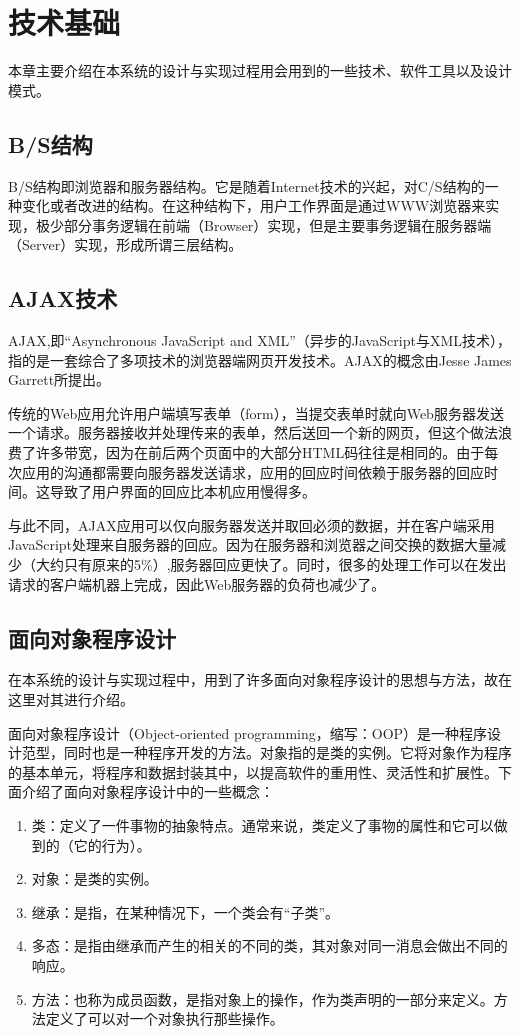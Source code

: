 
\chapter{技术基础}
本章主要介绍在本系统的设计与实现过程用会用到的一些技术、软件工具以及设计模式。
\section{B/S结构}

\gls{B/S}结构即浏览器和服务器结构。它是随着Internet技术的兴起，对\gls{C/S}结构的一种变化或者改进的结构。在这种结构下，用户工作界面是通过WWW浏览器来实现，极少部分事务逻辑在前端（Browser）实现，但是主要事务逻辑在服务器端（Server）实现，形成所谓三层结构。

\section{AJAX技术}

\gls{AJAX},即“Asynchronous JavaScript and \gls{XML}”（异步的JavaScript与XML技术），指的是一套综合了多项技术的浏览器端网页开发技术。AJAX的概念由Jesse James Garrett所提出。

传统的Web应用允许用户端填写表单（form），当提交表单时就向Web服务器发送一个请求。服务器接收并处理传来的表单，然后送回一个新的网页，但这个做法浪费了许多带宽，因为在前后两个页面中的大部分HTML码往往是相同的。由于每次应用的沟通都需要向服务器发送请求，应用的回应时间依赖于服务器的回应时间。这导致了用户界面的回应比本机应用慢得多。

与此不同，AJAX应用可以仅向服务器发送并取回必须的数据，并在客户端采用JavaScript处理来自服务器的回应。因为在服务器和浏览器之间交换的数据大量减少（大约只有原来的5\%）,服务器回应更快了。同时，很多的处理工作可以在发出请求的客户端机器上完成，因此Web服务器的负荷也减少了。


\section{面向对象程序设计}

在本系统的设计与实现过程中，用到了许多面向对象程序设计的思想与方法，故在这里对其进行介绍。

面向对象程序设计（Object-oriented programming，缩写：OOP）是一种程序设计范型，同时也是一种程序开发的方法。对象指的是类的实例。它将对象作为程序的基本单元，将程序和数据封装其中，以提高软件的重用性、灵活性和扩展性\cite{rentsch1982object}。下面介绍了面向对象程序设计中的一些概念：
\begin{enumerate}
\item 类：定义了一件事物的抽象特点。通常来说，类定义了事物的属性和它可以做到的（它的行为）。
\item 对象：是类的实例。
\item 继承：是指，在某种情况下，一个类会有“子类”。
\item 多态：是指由继承而产生的相关的不同的类，其对象对同一消息会做出不同的响应。
\item 方法：也称为成员函数，是指对象上的操作，作为类声明的一部分来定义。方法定义了可以对一个对象执行那些操作。
\end{enumerate}




